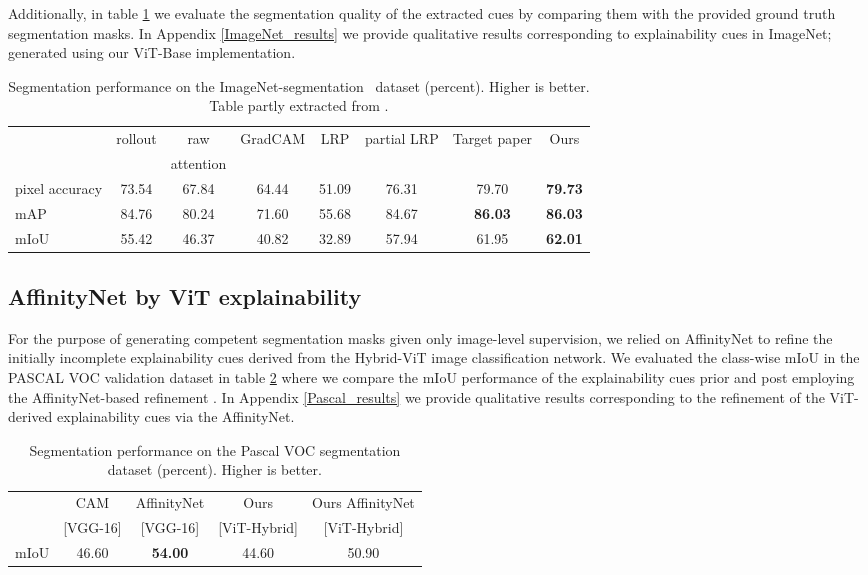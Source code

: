 Additionally, in table \ref{tab:segmentation} we evaluate the segmentation quality of the extracted cues by comparing them with the provided ground truth segmentation masks. In Appendix \ref{ImageNet_results} we provide qualitative results corresponding to explainability cues in ImageNet; generated using our ViT-Base implementation.

\begin{table}[!h]
    \begin{tabular*}{\linewidth}{@{\extracolsep{\fill}}lccccccc}
        &rollout & raw  & GradCAM & LRP & partial LRP & Target paper & Ours\\
        &~\cite{samira2005} & attention &~\cite{selvaraju2017grad} &~\cite{binder2016layer} &~\cite{voita2019analyzing} &~\cite{mainpaper} & \\
        pixel accuracy & 73.54 & 67.84 & 64.44 & 51.09 & 76.31 & 79.70 & \textbf{79.73}\\
        mAP & 84.76 & 80.24 & 71.60 & 55.68 & 84.67 & \textbf{86.03} & \textbf{86.03}\\
        mIoU & 55.42 & 46.37 & 40.82 & 32.89 & 57.94 & 61.95 & \textbf{62.01}\\
    \end{tabular*}
    \caption{Segmentation performance on the ImageNet-segmentation~\cite{imagenet-seg} dataset (percent). Higher is better. Table partly extracted from \cite{mainpaper}.}
    \label{tab:segmentation}
\end{table}

\subsection{AffinityNet by ViT explainability}
For the purpose of generating competent segmentation masks given only image-level supervision, we relied on AffinityNet to refine the initially incomplete explainability cues derived from the Hybrid-ViT image classification network. We evaluated the class-wise mIoU in the PASCAL VOC validation dataset in table \ref{tab:Affinity} where we compare the mIoU performance of the explainability cues prior and post employing the AffinityNet-based refinement \cite{ahn2018learning}. In Appendix \ref{Pascal_results} we provide qualitative results corresponding to the refinement of the ViT-derived explainability cues via the AffinityNet.

\begin{table}[!h]
    \begin{tabular*}{\linewidth}{@{\extracolsep{\fill}}lcccc}
        &CAM \cite{zhou2016learning} & AffinityNet \cite{ahn2018learning} & Ours & Ours AffinityNet \\        &[VGG-16] & [VGG-16] & [ViT-Hybrid] & [ViT-Hybrid] \\  
        mIoU & 46.60 & \textbf{54.00} & 44.60 & 50.90\\
    \end{tabular*}
    \caption{Segmentation performance on the Pascal VOC segmentation \cite{pascalvoc} dataset (percent). Higher is better.}
    \label{tab:Affinity}
\end{table}


